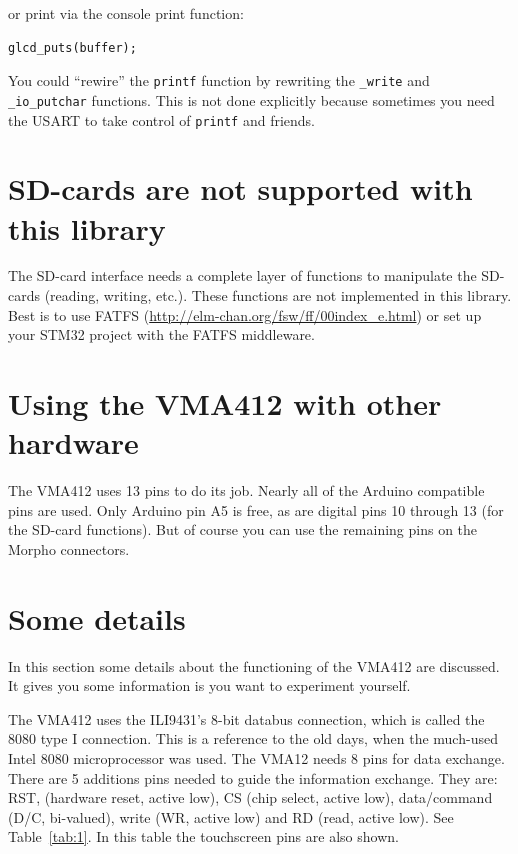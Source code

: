 \documentclass[12pt]{article}
\begin{document}
or print via the console print function:

\begin{lstlisting}
glcd_puts(buffer);
\end{lstlisting}

You could ``rewire'' the \lstinline|printf| function by rewriting the \lstinline|_write| and \lstinline|_io_putchar| functions. This is not done explicitly because sometimes you need the USART to take control of \lstinline|printf| and friends.


\section{SD-cards are not supported with this library}
The SD-card interface needs a complete layer of functions to manipulate the SD-cards (reading, writing, etc.). These functions are not implemented in this library. Best is to use FATFS (\url{http://elm-chan.org/fsw/ff/00index_e.html}) or set up your STM32 project with the FATFS middleware.


\section{Using the VMA412 with other hardware}
The VMA412 uses 13 pins to do its job. Nearly all of the Arduino compatible pins are used. Only Arduino pin A5 is free, as are digital pins 10 through 13 (for the SD-card functions). But of course you can use the remaining pins on the Morpho connectors.


\section{Some details}
In this section some details about the functioning of the VMA412 are discussed. It gives you some information is you want to experiment yourself.

The VMA412 uses the ILI9431's 8-bit databus connection, which is called the 8080 type I connection. This is a reference to the old days, when the much-used Intel 8080 microprocessor was used. The VMA12 needs 8 pins for data exchange. There are 5 additions pins needed to guide the information exchange. They are: RST, (hardware reset, active low), CS (chip select, active low), data/command (D/C, bi-valued), write (WR, active low) and RD (read, active low). See Table~\ref{tab:1}. In this table the touchscreen pins are also shown.
\end{document}
